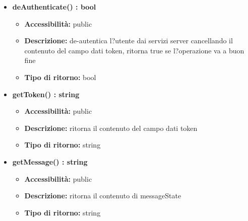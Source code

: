 {{\begin{itemize}
\begin{itemize}
			\item \textbf{Tipo di ritorno:} bool
			\end{itemize}
			
		\item \textbf{deAuthenticate() : bool}
			\begin{itemize}
			\item \textbf{Accessibilit\`{a}:} public
			\item \textbf{Descrizione:} de-autentica l?utente dai servizi server cancellando il contenuto del campo dati token, ritorna true se l?operazione va a buon fine
			\item \textbf{Tipo di ritorno:} bool
			\end{itemize}
			
		\item \textbf{getToken() : string}
			\begin{itemize}
			\item \textbf{Accessibilit\`{a}:} public
			\item \textbf{Descrizione:} ritorna il contenuto del campo dati token
			\item \textbf{Tipo di ritorno:} string
			\end{itemize}
			
		\item \textbf{getMessage() : string}
			\begin{itemize}
			\item \textbf{Accessibilit\`{a}:} public
			\item \textbf{Descrizione:} ritorna il contenuto di messageState
			\item \textbf{Tipo di ritorno:} string
			\end{itemize}

		\end{itemize}
	}
}
	
	
	
	
	
	
	
	
	
	